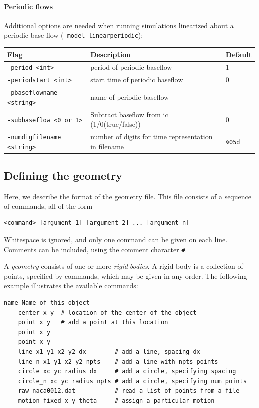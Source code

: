 \documentclass[11pt]{article}
\begin{document}
\paragraph{Periodic flows}
Additional options are needed when running simulations linearized about a periodic base flow (\verb|-model linearperiodic|):

\begin{center}
\begin{tabular}{lll}
Flag & Description & Default\\
\hline
\verb|-period <int>|    & period of periodic baseflow & 1\\
\verb|-periodstart <int>| & start time of periodic baseflow & 0\\
\verb|-pbaseflowname <string>| & name of periodic baseflow\\
\verb|-subbaseflow <0 or 1>| & Subtract baseflow from ic (1/0(true/false)) & 0\\
\verb|-numdigfilename <string>| & number of digits for time representation in filename & {\tt \%05d}
\end{tabular}
\end{center}

\subsection{Defining the geometry}
\label{sub:defining_the_geometry}
Here, we describe the format of the geometry file.  This file consists of a sequence of commands, all of the form
\begin{Verbatim}[gobble=4]
    <command> [argument 1] [argument 2] ... [argument n]
\end{Verbatim}
Whitespace is ignored, and only one command can be given on each line.  Comments can be included, using the comment character {\tt \#}.

A {\em geometry\/} consists of one or more {\em rigid bodies}.  A rigid body is a collection of points, specified by commands, which may be given in any order.  The following example illustrates the available commands:

\begin{Verbatim}[gobble=4]
    name Name of this object
    center x y  # location of the center of the object
    point x y   # add a point at this location
    point x y
    point x y
    line x1 y1 x2 y2 dx        # add a line, spacing dx
    line_n x1 y1 x2 y2 npts    # add a line with npts points
    circle xc yc radius dx     # add a circle, specifying spacing
    circle_n xc yc radius npts # add a circle, specifying num points
    raw naca0012.dat           # read a list of points from a file
    motion fixed x y theta     # assign a particular motion
\end{Verbatim}
\end{document}
